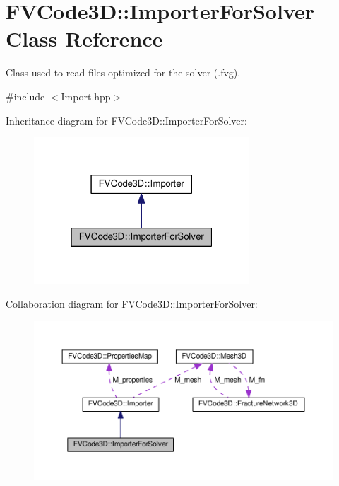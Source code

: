 \hypertarget{classFVCode3D_1_1ImporterForSolver}{}\section{F\+V\+Code3D\+:\+:Importer\+For\+Solver Class Reference}
\label{classFVCode3D_1_1ImporterForSolver}


Class used to read files optimized for the solver (.fvg).  




{\ttfamily \#include $<$Import.\+hpp$>$}



Inheritance diagram for F\+V\+Code3D\+:\+:Importer\+For\+Solver\+:
\nopagebreak
\begin{figure}[H]
\begin{center}
\leavevmode
\includegraphics[width=229pt]{classFVCode3D_1_1ImporterForSolver__inherit__graph}
\end{center}
\end{figure}


Collaboration diagram for F\+V\+Code3D\+:\+:Importer\+For\+Solver\+:
\nopagebreak
\begin{figure}[H]
\begin{center}
\leavevmode
\includegraphics[width=350pt]{classFVCode3D_1_1ImporterForSolver__coll__graph}
\end{center}
\end{figure}
